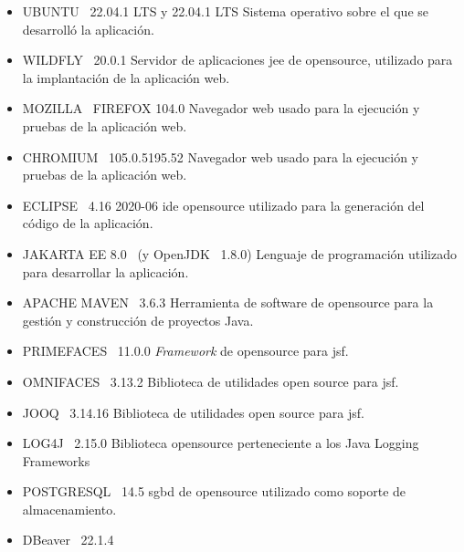\begin{itemize}
 \item UBUNTU~\cite{Ubuntu} 22.04.1 LTS y 22.04.1 LTS\newline
 Sistema operativo sobre el que se desarrolló la aplicación.
 \item WILDFLY~ \cite{Wildfly} 20.0.1\newline
 Servidor de aplicaciones \acrshort{jee} de \gls{opensource}, utilizado para la implantación de la aplicación web.
 \item MOZILLA~\cite{Mozilla} FIREFOX 104.0\newline
 Navegador web usado para la ejecución y pruebas de la aplicación web.
  \item CHROMIUM~\cite{Chromium} 105.0.5195.52\newline
 Navegador web usado para la ejecución y pruebas de la aplicación web.
 \item ECLIPSE~\cite{EclipseIDE} 4.16 2020-06\newline
 \acrfull{ide} \gls{opensource} utilizado para la generación del código de la aplicación.
 \item JAKARTA EE 8.0~\cite{JakartaEE} (y OpenJDK~\cite{OpenJDK} 1.8.0)\newline
 Lenguaje de programación utilizado para desarrollar la aplicación.
 \item APACHE MAVEN~\cite{ApacheMaven} 3.6.3\newline
 Herramienta de software de \gls{opensource} para la gestión y construcción de proyectos Java.
 \item PRIMEFACES~\cite{Primefaces} 11.0.0\newline
 \emph{Framework} de \gls{opensource} para \acrshort{jsf}.
 \item OMNIFACES~\cite{Omnifaces} 3.13.2\newline
 Biblioteca de utilidades open source para \acrshort{jsf}. 
 \item JOOQ~\cite{JooQ} 3.14.16\newline
 Biblioteca de utilidades open source para \acrshort{jsf}.  
 \item LOG4J~\cite{Log4j} 2.15.0\newline
 Biblioteca \gls{opensource} perteneciente a los Java Logging Frameworks 
 \item POSTGRESQL~\citep{Postgresql} 14.5\newline
 \acrshort{sgbd} de \gls{opensource} utilizado como soporte de almacenamiento.
 \item DBeaver~\cite{DBeaver} 22.1.4\newline

\end{itemize}
